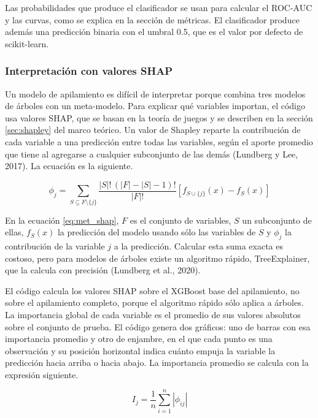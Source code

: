 Las probabilidades que produce el clasificador se usan para calcular el ROC-AUC y las curvas, como se explica en la sección de métricas. El clasificador produce además una predicción binaria con el umbral 0.5, que es el valor por defecto de scikit-learn.

\subsubsection{Interpretación con valores SHAP}
Un modelo de apilamiento es difícil de interpretar porque combina tres modelos de árboles con un meta-modelo. Para explicar qué variables importan, el código usa valores SHAP, que se basan en la teoría de juegos y se describen en la sección \ref{sec:shapley} del marco teórico. Un valor de Shapley reparte la contribución de cada variable a una predicción entre todas las variables, según el aporte promedio que tiene al agregarse a cualquier subconjunto de las demás (Lundberg y Lee, 2017). La ecuación es la siguiente.

\begin{equation}
\label{eq:met_shap}
\phi_j = \sum_{S \subseteq F\setminus\{j\}} \frac{|S|!\,(|F|-|S|-1)!}{|F|!}\left[f_{S\cup\{j\}}(x) - f_S(x)\right]
\end{equation}

En la ecuación \eqref{eq:met_shap}, $F$ es el conjunto de variables, $S$ un subconjunto de ellas, $f_S(x)$ la predicción del modelo usando sólo las variables de $S$ y $\phi_j$ la contribución de la variable $j$ a la predicción. Calcular esta suma exacta es costoso, pero para modelos de árboles existe un algoritmo rápido, TreeExplainer, que la calcula con precisión (Lundberg et al., 2020).

El código calcula los valores SHAP sobre el XGBoost base del apilamiento, no sobre el apilamiento completo, porque el algoritmo rápido sólo aplica a árboles. La importancia global de cada variable es el promedio de sus valores absolutos sobre el conjunto de prueba. El código genera dos gráficos: uno de barras con esa importancia promedio y otro de enjambre, en el que cada punto es una observación y su posición horizontal indica cuánto empuja la variable la predicción hacia arriba o hacia abajo. La importancia promedio se calcula con la expresión siguiente.

\begin{equation}
\label{eq:met_shap_media}
I_j = \frac{1}{n}\sum_{i=1}^{n} |\phi_{ij}|
\end{equation}

